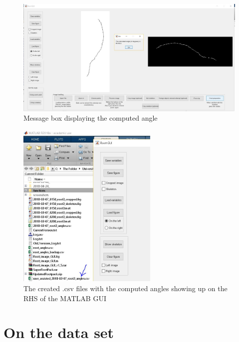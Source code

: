 \begin{figure}[H]
	\centering
	\includegraphics[width=\textwidth]{../Figures/manual/optionalE6.jpg}
	\caption{Message box displaying the computed angle}
	\label{fig:img67}
\end{figure}

\begin{figure}[H]
	\centering
	\includegraphics[width=0.6\textwidth]{../Figures/manual/optionalE7.jpg}
	\caption{The created .csv files with the computed angles showing up on the RHS of the MATLAB GUI}
	\label{fig:img68}
\end{figure}


\chapter{On the data set}

